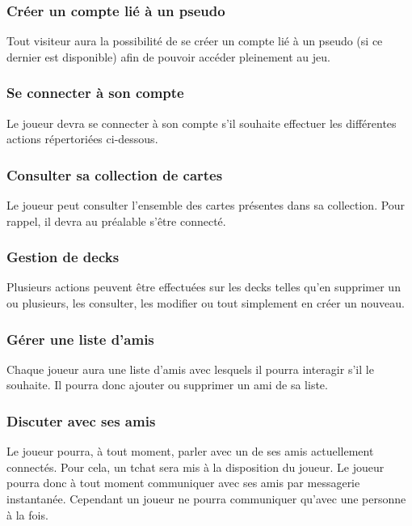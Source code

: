 \documentclass[11pt,a4paper]{article}
\begin{document}
\subsubsection*{Créer un compte lié à un pseudo}

Tout visiteur aura la possibilité de se créer un compte
lié à un \gls{pseudo} (si ce dernier est disponible) afin de pouvoir
accéder pleinement au jeu.


\subsubsection*{Se connecter à son compte}

Le joueur devra se connecter à son compte s'il souhaite effectuer
les différentes actions répertoriées ci-dessous.


\subsubsection*{Consulter sa collection de cartes}

Le joueur peut consulter l'ensemble des cartes présentes dans sa
\gls{collection}. Pour rappel, il devra au préalable s'être connecté.


\subsubsection*{Gestion de decks}

Plusieurs actions peuvent être effectuées sur les decks telles
qu'en supprimer un ou plusieurs, les consulter, les modifier ou tout
simplement en créer un nouveau.


\subsubsection*{Gérer une liste d'amis}

Chaque joueur aura une liste d'amis avec lesquels il pourra
interagir s'il le souhaite. Il pourra donc ajouter ou supprimer un ami de sa liste.


\subsubsection*{Discuter avec ses amis}

Le joueur pourra, à tout moment, parler avec un de ses amis
actuellement connectés. Pour cela, un \gls{tchat} sera mis à la disposition
du joueur.  Le joueur pourra donc à tout moment communiquer avec ses amis par
messagerie instantanée. Cependant un joueur ne pourra communiquer qu'avec
une personne à la fois.
\end{document}
